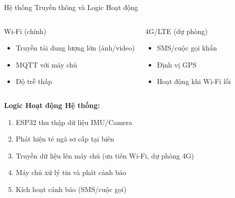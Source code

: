 \begin{frame}{Hệ thống Truyền thông và Logic Hoạt động}
\begin{columns}[T]
    \begin{alertblock}{Wi-Fi (chính)}
        \begin{itemize}
            \item Truyền tải dung lượng lớn (ảnh/video)
            \item MQTT với máy chủ
            \item Độ trễ thấp
        \end{itemize}
    \end{alertblock}

    \begin{alertblock}{4G/LTE (dự phòng)}
        \begin{itemize}
            \item SMS/cuộc gọi khẩn
            \item Định vị GPS
            \item Hoạt động khi Wi-Fi lỗi
        \end{itemize}
    \end{alertblock}
\end{columns}

\vspace{0.3cm}

\textbf{Logic Hoạt động Hệ thống:}
\begin{enumerate}
    \item ESP32 thu thập dữ liệu IMU/Camera
    \item Phát hiện té ngã sơ cấp tại biên
    \item Truyền dữ liệu lên máy chủ (ưu tiên Wi-Fi, dự phòng 4G)
    \item Máy chủ xử lý tin và phát cảnh báo
    \item Kích hoạt cảnh báo (SMS/cuộc gọi)
\end{enumerate}
\end{frame}
